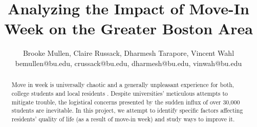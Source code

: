 \documentclass[journal, a4paper]{IEEEtran}
\begin{document}
    \title{Analyzing the Impact of Move-In Week on the Greater Boston Area}
    \author{Brooke Mullen, Claire Russack, Dharmesh Tarapore, Vincent Wahl
    \\bemullen@bu.edu, crussack@bu.edu, dharmesh@bu.edu, vinwah@bu.edu
    }
    \maketitle

\begin{abstract}
    Move in week is universally chaotic and a generally unpleasant experience for both, college students and local residents \cite{painfulmovein}. Despite universities' meticulous attempts to mitigate trouble, the logistical concerns presented by the sudden influx of over 30,000 students are inevitable. In this project, we attempt to identify specific factors affecting residents' quality of life (as a result of move-in week) and study ways to improve it.   
\end{abstract}

\end{document}
